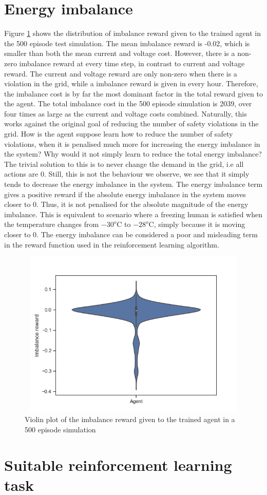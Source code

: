 \documentclass[class=book, crop=false]{standalone}
\begin{document}
\section{Energy imbalance}
Figure \ref{fig:discussion:config1_imbalance_reward} shows the distribution of imbalance reward given to the trained agent in the 500 episode test simulation. The mean imbalance reward is -0.02, which is smaller than both the mean current and voltage cost. However, there is a non-zero imbalance reward at every time step, in contrast to current and voltage reward. The current and voltage reward are only non-zero when there is a violation in the grid, while a imbalance reward is given in every hour. Therefore, the imbalance cost is by far the most dominant factor in the total reward given to the agent. The total imbalance cost in the 500 episode simulation is 2039, over four times as large as the current and voltage costs combined. Naturally, this works against the original goal of reducing the number of safety violations in the grid. How is the agent suppose learn how to reduce the number of safety violations, when it is penalised much more for increasing the energy imbalance in the system? Why would it not simply learn to reduce the total energy imbalance? The trivial solution to this is to never change the demand in the grid, i.e all actions are 0. Still, this is not the behaviour we observe, we see that it simply tends to decrease the energy imbalance in the system. The energy imbalance term gives a positive reward if the absolute energy imbalance in the system moves closer to 0. Thus, it is not penalised for the absolute magnitude of the energy imbalance. This is equivalent to scenario where a freezing human is satisfied when the temperature changes from $-30^{o}$C to $-28^{o}$C, simply because it is moving closer to 0. The energy imbalance can be considered a poor and misleading term in the reward function used in the reinforcement learning algorithm.   

\begin{figure}[h]
    \center
\includegraphics[height=8cm, width=12cm]{figures/config1_imbalance_reward.png}
    \caption[size = 9]{Violin plot of the imbalance reward given to the trained agent in a 500 episode simulation}
    \label{fig:discussion:config1_imbalance_reward}
\end{figure}

\section{Suitable reinforcement learning task}
\end{document}

